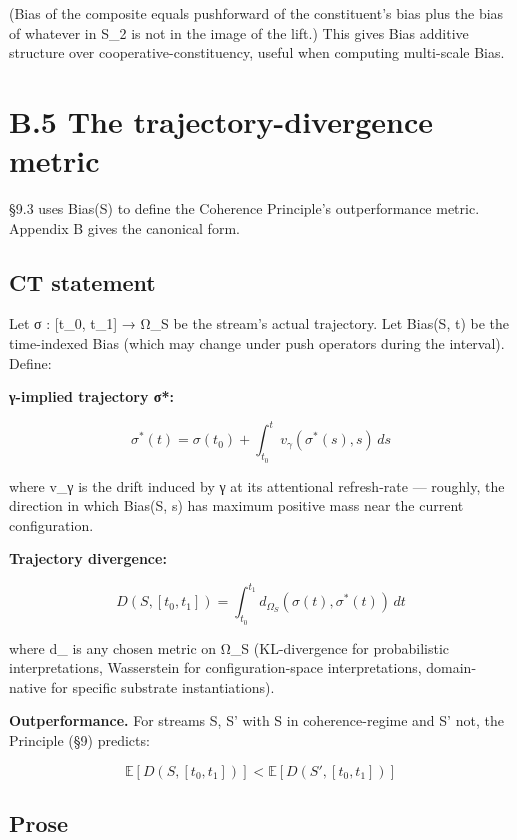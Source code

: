 \documentclass[11pt, openany]{book}
\newcommand{\sectionbreak}{\clearpage}
\begin{document}
(Bias of the composite equals pushforward of the constituent's bias plus the bias of whatever in S\_\allowbreak{}2 is not in the image of the lift.) This gives Bias additive structure over cooperative-constituency, useful when computing multi-scale Bias.

\sectionbreak

\section{B.5 The trajectory-divergence metric}

§9.3 uses Bias(S) to define the Coherence Principle's outperformance metric. Appendix B gives the canonical form.

\subsection{CT statement}

Let σ : [t\_\allowbreak{}0, t\_\allowbreak{}1] → Ω\_\allowbreak{}S be the stream's actual trajectory. Let Bias(S, t) be the time-indexed Bias (which may change under push operators during the interval). Define:

\textbf{γ-implied trajectory σ*:}

$$\sigma^*(t) = \sigma(t_0) + \int_{t_0}^{t} v_\gamma(\sigma^*(s), s) \, ds$$

where v\_\allowbreak{}γ is the drift induced by γ at its attentional refresh-rate --- roughly, the direction in which Bias(S, s) has maximum positive mass near the current configuration.

\textbf{Trajectory divergence:}

$$D(S, [t_0, t_1]) = \int_{t_0}^{t_1} d_{\Omega_S}(\sigma(t), \sigma^*(t)) \, dt$$

where d\_ is any chosen metric on Ω\_\allowbreak{}S (KL-divergence for probabilistic interpretations, Wasserstein for configuration-space interpretations, domain-native for specific substrate instantiations).

\textbf{Outperformance.} For streams S, S' with S in coherence-regime and S' not, the Principle (§9) predicts:

$$\mathbb{E}[D(S, [t_0, t_1])] < \mathbb{E}[D(S', [t_0, t_1])]$$

\subsection{Prose}
\end{document}

